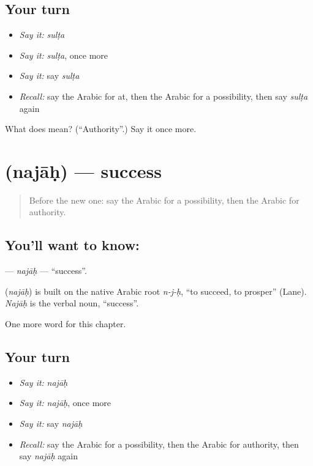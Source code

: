 \subsection*{Your turn}
\begin{itemize}
\raggedright
  \item \emph{Say it:} \emph{sulṭa}
  \item \emph{Say it:} \emph{sulṭa}, once more
  \item \emph{Say it:} say \emph{sulṭa}
  \item \emph{Recall:} say the Arabic for at, then the Arabic for a possibility, then say \emph{sulṭa} again
\end{itemize}

\begin{tcolorbox}[breakable,colback=teal!4,colframe=teal!35!black,title={Before you move on}]
What does  mean? (\textquotedblleft{}Authority\textquotedblright{}.) Say it once more.
\end{tcolorbox}
\section[\texorpdfstring{\ar{نجاح} (najāḥ)}{نجاح (najāḥ)}]{ (najāḥ) — success}

\label{lesson:AR-C106-najah}



\begin{quote}
Before the new one: say the Arabic for a possibility, then the Arabic for authority.
\end{quote}

\subsection*{You'll want to know: }
\textbf{} — \emph{najāḥ} — \textquotedblleft{}success\textquotedblright{}.

\begin{cousinweb}
\textbf{} (\emph{najāḥ}) is built on the native Arabic root \emph{n-j-ḥ}, \textquotedblleft{}to succeed, to prosper\textquotedblright{} (Lane). \emph{Najāḥ} is the verbal noun, \textquotedblleft{}success\textquotedblright{}.
\end{cousinweb}

\begin{grammarlens}[title={What you've built}]
One more word for this chapter.
\end{grammarlens}

\subsection*{Your turn}
\begin{itemize}
\raggedright
  \item \emph{Say it:} \emph{najāḥ}
  \item \emph{Say it:} \emph{najāḥ}, once more
  \item \emph{Say it:} say \emph{najāḥ}
  \item \emph{Recall:} say the Arabic for a possibility, then the Arabic for authority, then say \emph{najāḥ} again
\end{itemize}

